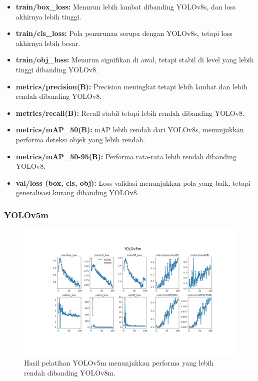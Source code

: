 \documentclass[12pt,a4paper]{article}
\begin{document}
\begin{itemize}
    \item \textbf{train/box\_loss:} Menurun lebih lambat dibanding YOLOv8s, dan loss akhirnya lebih tinggi.
    \item \textbf{train/cls\_loss:} Pola penurunan serupa dengan YOLOv8s, tetapi loss akhirnya lebih besar.
    \item \textbf{train/obj\_loss:} Menurun signifikan di awal, tetapi stabil di level yang lebih tinggi dibanding YOLOv8.
    \item \textbf{metrics/precision(B):} Precision meningkat tetapi lebih lambat dan lebih rendah dibanding YOLOv8.
    \item \textbf{metrics/recall(B):} Recall stabil tetapi lebih rendah dibanding YOLOv8.
    \item \textbf{metrics/mAP\_50(B):} mAP lebih rendah dari YOLOv8s, menunjukkan performa deteksi objek yang lebih rendah.
    \item \textbf{metrics/mAP\_50-95(B):} Performa rata-rata lebih rendah dibanding YOLOv8.
    \item \textbf{val/loss (box, cls, obj):} Loss validasi menunjukkan pola yang baik, tetapi generalisasi kurang dibanding YOLOv8.
\end{itemize}

\subsubsection{YOLOv5m}

\begin{figure}[H]
    \centering
    \includegraphics[width=0.6\linewidth]{assets/yolov5m_results.png}
    \caption{Hasil pelatihan YOLOv5m menunjukkan performa yang lebih rendah dibanding YOLOv8m.}
    \label{fig:yolov5m_results}
\end{figure}
\end{document}

